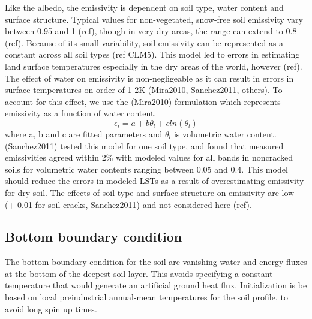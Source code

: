 \documentclass[twoside,10pt]{report}
\begin{document}
Like the albedo, the emissivity is dependent on soil type, water content and surface structure. Typical values for non-vegetated, snow-free soil emissivity vary between 0.95 and 1 (ref), though in very dry areas, the range can extend to 0.8 (ref). Because of its small variability, soil emissivity can be represented as a constant across all soil types (ref CLM5). This model led to errors in estimating land surface temperatures especially in the dry areas of the world, however (ref). The effect of water on emissivity is non-negligeable as it can result in errors in surface temperatures on order of 1-2K (Mira2010, Sanchez2011, others). To account for this effect, we use the (Mira2010) formulation which represents emissivity as a function of water content. 
\begin{equation}
    \epsilon_i = a + b\theta_l + c ln(\theta_l)
    \label{eq:clm_emissivity}
\end{equation}
where a, b and c are fitted parameters and $\theta_l$ is volumetric water content. (Sanchez2011) tested this model for one soil type, and found that measured emissivities agreed within 2\% with modeled values for all bands in noncracked soils for volumetric water contents ranging between 0.05 and 0.4. This model should reduce the errors in modeled LSTs as a result of overestimating emissivity for dry soil. The effects of soil type and surface structure on emissivity are low (+-0.01 for soil cracks, Sanchez2011) and not considered here (ref). 
\subsection{Bottom boundary condition}

The bottom boundary condition for the soil are vanishing water and energy fluxes at the bottom of the deepest soil layer. This avoids specifying a constant temperature that would generate an artificial ground heat flux. Initialization is be based on local preindustrial annual-mean temperatures for the soil profile, to avoid long spin up times.

\end{document}
